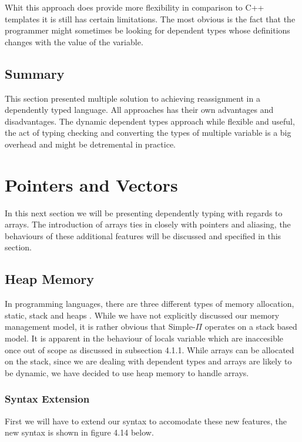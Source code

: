 \documentclass[a4paper,12pt]{report}
\begin{document}
\par
Whit this approach does provide more flexibility in comparison to 
C++ templates it is still has certain limitations. The most obvious is the fact 
that the programmer might sometimes be looking for dependent types 
whose definitions changes with the value of the variable. 

\subsection{Summary}
This section presented multiple solution to achieving reassignment in a 
dependently typed language. All approaches has their own advantages and 
disadvantages. The dynamic dependent types approach while flexible and useful, 
the act of typing checking and converting the types of multiple variable is a 
big overhead and might be detremental in practice. 

\section{Pointers and Vectors}
In this next section we will be presenting dependently typing with regards to 
arrays. The introduction of arrays ties in closely with pointers and aliasing, 
the behaviours of these additional features will be discussed and specified in this 
section.

\subsection{Heap Memory}
In programming languages, there are three different types of memory allocation, 
static, stack and heaps \cite{heapVsStack}. While we have not explicitly 
discussed our memory management model, it is rather obvious that Simple-$\Pi$ 
operates on a stack based model. It is apparent in the behaviour of locals 
variable which are inaccesible once out of scope as discussed in subsection 
4.1.1. While arrays can be allocated on the stack, since we are dealing 
with dependent types and arrays are likely to be dynamic, we have decided to use heap 
memory to handle arrays. 

\subsubsection{Syntax Extension}
First we will have to extend our syntax to accomodate these new features, the 
new syntax is shown in figure 4.14 below.
\end{document}

